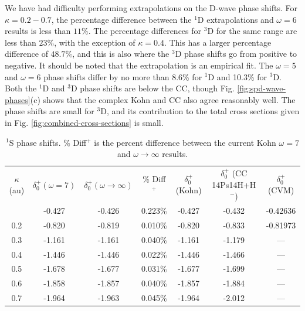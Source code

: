 \documentclass[preprint,showpacs,preprintnumbers,amsmath,amssymb,longbibliography,pra,aps]{revtex4-1}
\begin{document}
We have had difficulty performing extrapolations on the D-wave phase shifts. For $\kappa = 0.2 - 0.7$, the percentage difference between the $^1$D extrapolations and $\omega = 6$ results is less than $11\%$. The percentage differences for $^3$D for the same range are less than $23\%$, with the exception of $\kappa = 0.4$. This has a larger percentage difference of $48.7\%$, and this is also where the $^3$D phase shifts go from positive to negative. It should be noted that the extrapolation is an empirical fit. The $\omega = 5$ and $\omega = 6$ phase shifts differ by no more than 8.6\% for $^1$D and 10.3\% for $^3$D. Both the $^1$D and $^3$D phase shifts are below the CC, though Fig. \ref{fig:spd-wave-phases}(c) shows that the complex Kohn and CC also agree reasonably well. The phase shifts are small for $^3$D, and its contribution to the total cross sections given in Fig. \ref{fig:combined-cross-sections} is small.


\begin{table}
\centering
\begin{ruledtabular}
\begin{tabular}{c c c c c c c}
$\kappa$ (au) & $\delta_0^+ (\omega = 7)$ & $\delta_0^+ (\omega \rightarrow \infty)$ & \% Diff$^+$ & $\delta_0^+$ (Kohn) \cite{VanReeth2003} & $\delta_0^+$ (CC 14Ps14H+H$^-$) \cite{Walters2004} & $\delta_0^+$ (CVM) \cite{Zhang2012} \\
\colrule
0.1 & -0.427 & -0.426 & 0.223\% & -0.427 & -0.432 & -0.42636 \\
0.2 & -0.820 & -0.819 & 0.010\% & -0.820 & -0.833 & -0.81973 \\
0.3 & -1.161 & -1.161 & 0.040\% & -1.161 & -1.179 & --- \\
0.4 & -1.446 & -1.446 & 0.022\% & -1.446 & -1.466 & --- \\
0.5 & -1.678 & -1.677 & 0.031\% & -1.677 & -1.699 & --- \\
0.6 & -1.858 & -1.857 & 0.040\% & -1.857 & -1.884 & --- \\
0.7 & -1.964 & -1.963 & 0.045\% & -1.964 & -2.012 & --- \\
\end{tabular}
\end{ruledtabular}
\caption{$^1$S phase shifts. \% Diff$^+$ is the percent difference between the current Kohn $\omega = 7$ and $\omega \rightarrow \infty$ results.}
\label{tab:SWaveSingletPhase}
\end{table}
\end{document}
